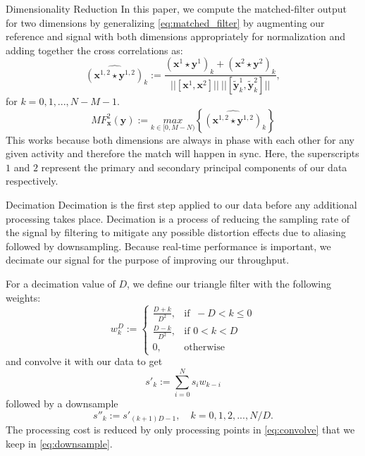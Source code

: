 \documentclass[unknownkeysallowed,final]{beamer}
\begin{document}
\begin{frame}{}
\begin{textblock}{18}
\begin{block}{\small{Dimensionality Reduction}}
In this paper, we compute the matched-filter output for two dimensions by generalizing \eqref{eq:matched_filter} by augmenting our reference and signal with both dimensions appropriately for normalization and adding together the cross correlations as:
%
\begin{equation} \label{eq:cross_correlation_2}
\widehat{(\textbf{x}^{1,2} \star \textbf{y}^{1,2})}_k := \frac{(\textbf{x}^1 \star \textbf{y}^1)_k + (\textbf{x}^2 \star \textbf{y}^2)_k}{||[ \textbf{x}^1, \textbf{x}^2 ]|| \ || [ \widetilde{\textbf{y}}_k^1, \widetilde{\textbf{y}}_k^2 ] || },
\end{equation}
%
for $ k = 0,1,...,N-M-1 $. \\
%
\begin{equation} \label{eq:matched_filter_2}
MF_{\textbf{x}}^2(\textbf{y}) := \underset{k \in [0, M-N)}{max} \left \{\widehat{(\textbf{x}^{1,2} \star \textbf{y}^{1,2})}_k \right \}
\end{equation}
%
This works because both dimensions are always in phase with each other for any given activity and therefore the match will happen in sync. Here, the superscripts $1$ and $2$ represent the primary and secondary principal components of our data respectively.
%
\end{block}

\begin{block}{\small{Decimation}}
Decimation is the first step applied to our data before any additional processing takes place.
Decimation is a process of reducing the sampling rate of the signal by filtering to mitigate any possible distortion effects due to aliasing followed by downsampling.
Because real-time performance is important, we decimate our signal for the purpose of improving our throughput.

For a decimation value of $D$, we define our triangle filter with the following weights:
%
\begin{equation} \label{eq:triangle_filter_weights}
w_k^D :=
\begin{cases}
  \frac{D+k}{D^2}, & \text{if }\ -D < k \leq 0 \\
  \frac{D-k}{D^2}, & \text{if } 0 < k < D \\
  0, & \text{otherwise}
\end{cases}
\end{equation}
%
and convolve it with our data to get
%
\begin{equation} \label{eq:convolve}
s'_k := \sum_{i=0}^{N} s_i w_{k-i}
\end{equation}
%
followed by a downsample
%
\begin{equation} \label{eq:downsample}
s''_k := s'_{(k+1)D-1}, \quad k = 0, 1, 2, ..., N/D.
\end{equation}
%
The processing cost is reduced by only processing points in \eqref{eq:convolve} that we keep in \eqref{eq:downsample}.
\end{block}



\end{textblock}
\end{frame}
\end{document}
